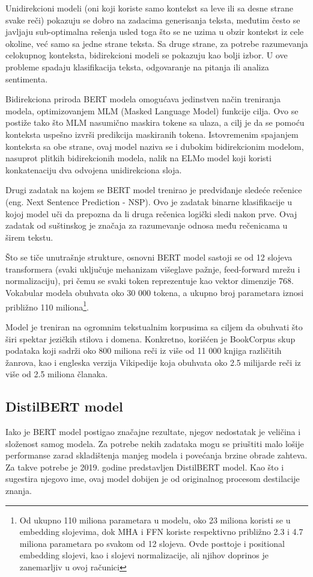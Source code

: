 \documentclass[12pt,oneside]{memoir}
\begin{document}
Unidirekcioni modeli (oni koji koriste samo kontekst sa leve ili sa desne strane svake reči) pokazuju se dobro na zadacima generisanja teksta, međutim često se javljaju sub-optimalna rešenja usled toga što se ne uzima u obzir kontekst iz cele okoline, već samo sa jedne strane teksta. Sa druge strane, za potrebe razumevanja celokupnog konteksta, bidirekcioni modeli se pokazuju kao bolji izbor. U ove probleme spadaju klasifikacija teksta, odgovaranje na pitanja ili analiza sentimenta.

Bidirekciona priroda BERT modela omogućava jedinstven način treniranja modela, optimizovanjem MLM (Masked Language Model) funkcije cilja. Ovo se postiže tako što MLM nasumično maskira tokene sa ulaza, a cilj je da se pomoću konteksta uspešno izvrši predikcija maskiranih tokena. Istovremenim spajanjem konteksta sa obe strane, ovaj model naziva se i dubokim bidirekcionim modelom, nasuprot plitkih bidirekcionih modela, nalik na ELMo\cite{ELMo} model koji koristi konkatenaciju dva odvojena unidirekciona sloja.

Drugi zadatak na kojem se BERT model trenirao je predviđanje sledeće rečenice (eng. Next Sentence Prediction - NSP). Ovo je zadatak binarne klasifikacije u kojoj model uči da prepozna da li druga rečenica logički sledi nakon prve. Ovaj zadatak od suštinskog je značaja za razumevanje odnosa među rečenicama u širem tekstu.

Što se tiče unutrašnje strukture, osnovni BERT model sastoji se od 12 slojeva transformera (svaki uključuje mehanizam višeglave pažnje, feed-forward mrežu i normalizaciju), pri čemu se svaki token reprezentuje kao vektor dimenzije 768. Vokabular modela obuhvata oko 30 000 tokena, a ukupno broj parametara iznosi približno 110 miliona\footnote{Od ukupno 110 miliona parametara u modelu, oko 23 miliona koristi se u embedding slojevima, dok MHA i FFN koriste respektivno približno 2.3 i 4.7 miliona parametara po svakom od 12 slojeva. Ovde posttoje i positional embedding slojevi, kao i slojevi normalizacije, ali njihov doprinos je zanemarljiv u ovoj računici }.


Model je treniran na ogromnim tekstualnim korpusima sa ciljem da obuhvati što širi spektar jezičkih stilova i domena. Konkretno, korišćen je BookCorpus skup podataka koji sadrži oko 800 miliona reči iz više od 11 000 knjiga različitih žanrova, kao i engleska verzija Vikipedije koja obuhvata oko 2.5 milijarde reči iz više od 2.5 miliona članaka.


\subsection{DistilBERT model}
Iako je BERT model postigao značajne rezultate, njegov nedostatak je veličina i složenost samog modela. Za potrebe nekih zadataka mogu se priuštiti malo lošije performanse zarad skladištenja manjeg modela i povećanja brzine obrade zahteva. Za takve potrebe je 2019. godine predstavljen DistilBERT\cite{DistilBERT} model. Kao što i sugestira njegovo ime, ovaj model dobijen je od originalnog procesom destilacije znanja.
\end{document}
